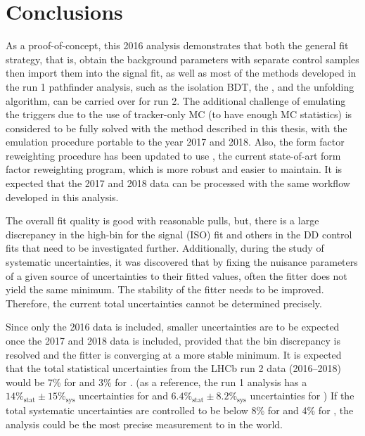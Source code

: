 \chapter{Conclusions}
\label{ref:conclusion}

As a proof-of-concept, this 2016 \RDX analysis demonstrates that both the
general fit strategy, that is, obtain the background parameters with separate
control samples then import them into the signal fit, as well as most of the
methods developed in the run 1 pathfinder analysis,
such as the isolation BDT, the \UBDT, and the unfolding algorithm,
can be carried over for run 2.
The additional challenge of emulating the triggers due to the use of
tracker-only MC (to have enough MC statistics) is considered to be fully solved
with the method described in this thesis, with the emulation procedure portable
to the year 2017 and 2018.
Also, the form factor reweighting procedure has been updated to use \Hammer,
the current state-of-art form factor reweighting program,
which is more robust and easier to maintain.
It is expected that the 2017 and 2018 data can be processed with the same
workflow developed in this analysis.

The overall fit quality is good with reasonable pulls,
but, there is a large discrepancy in the high-\qSq bin for the \Dstar signal
(ISO) fit and others in the DD control fits that need to be investigated
further.
Additionally, during the study of systematic uncertainties,
it was discovered that by fixing the nuisance parameters of a given source of
uncertainties to their fitted values,
often the fitter does not yield the same minimum.
The stability of the fitter needs to be improved.
Therefore, the current total uncertainties cannot be determined precisely.

Since only the 2016 data is included,
smaller uncertainties are to be expected once the 2017 and 2018 data is
included,
provided that the \qSq bin discrepancy is resolved and the fitter is converging
at a more stable minimum.
It is expected that the total statistical uncertainties from the LHCb run 2 data
(2016--2018) would be 7\% for \RD and 3\% for \RDst.
(as a reference, the run 1 analysis has a
$14\%_\text{stat} \pm 15\%_\text{sys}$ uncertainties for \RD and
$6.4\%_\text{stat} \pm 8.2\%_\text{sys}$ uncertainties for \RDst)
If the total systematic uncertainties are controlled to be below 8\% for \RD
and 4\% for \RDst,
the analysis could be the most precise measurement to \RDX in the world.
